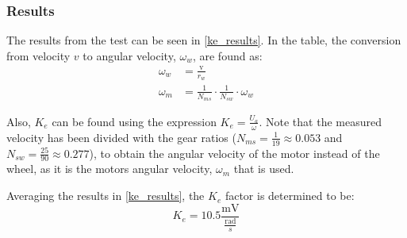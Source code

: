 \subsubsection{Results}
The results from the test can be seen in \autoref{ke_results}. In the table, the conversion from velocity $v$ to angular velocity, $\omega_w$, are found as: 
\begin{align}
\omega_w &= \frac{\text{v}}{r_w}\\
\omega_m &= \frac{1}{N_{ms}}\cdot\frac{1}{N_{sw}}\cdot\omega_w
\end{align}
\begin{where}
\end{where}
 
Also, $K_e$ can be found using the expression $K_e = \frac{U_a}{\omega}$.
Note that the measured velocity has been divided with the gear ratios ($N_{ms} = \frac{1}{19} \approx 0.053$ and $N_{sw} = \frac{25}{90} \approx 0.277$), to obtain the angular velocity of the motor instead of the wheel, as it is the motors angular velocity, $\omega_m$ that is used.


\begin{table}[H]
\centering
{}
\caption{Results from the test to determine the $K_e$ factor.}
\label{ke_results}
\end{table}
Averaging the results in \autoref{ke_results}, the $K_e$ factor is determined to be:
$$K_e = 10.5 \frac{\text{mV}}{\frac{\text{rad}}{s}}$$


